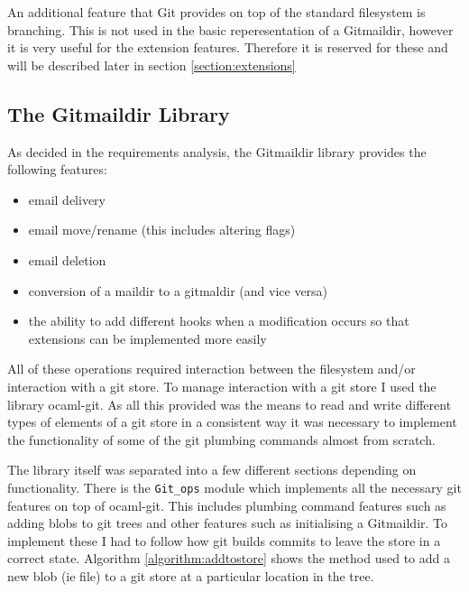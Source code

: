 An additional feature that Git provides on top of the standard filesystem is branching. This is not used in the basic reperesentation of a Gitmaildir, however it is very useful for the extension features. Therefore it is reserved for these and will be described later in section \ref{section:extensions}

\subsection{The Gitmaildir Library}

As decided in the requirements analysis, the Gitmaildir library provides the following features:

\begin{itemize}
\item email delivery
\item email move/rename (this includes altering flags)
\item email deletion
\item conversion of a maildir to a gitmaldir (and vice versa)
\item the ability to add different hooks when a modification occurs so that extensions can be implemented more easily
\end{itemize}

All of these operations required interaction between the filesystem and/or interaction with a git store. To manage interaction with a git store I used the library ocaml-git. As all this provided was the means to read and write different types of elements of a git store in a consistent way it was necessary to implement the functionality of some of the git plumbing commands almost from scratch.

The library itself was separated into a few different sections depending on functionality. There is the \texttt{Git\_ops} module which implements all the necessary git features on top of ocaml-git. This includes plumbing command features such as adding blobs to git trees and other features such as initialising a Gitmaildir. To implement these I had to follow how git builds commits to leave the store in a correct state. Algorithm \ref{algorithm:addtostore} shows the method used to add a new blob (ie file) to a git store at a particular location in the tree.

